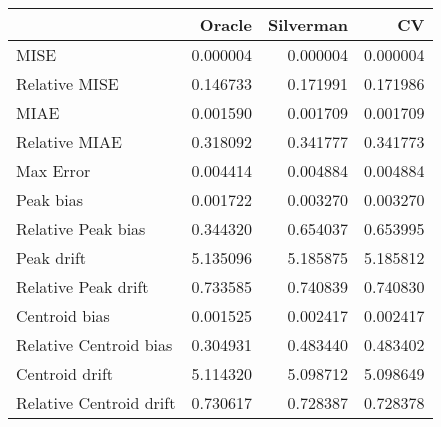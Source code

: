 \begin{tabular}{lrrr}
  \hline
 & Oracle & Silverman & CV \\ 
  \hline
MISE & 0.000004 & 0.000004 & 0.000004 \\ 
  Relative MISE & 0.146733 & 0.171991 & 0.171986 \\ 
  MIAE & 0.001590 & 0.001709 & 0.001709 \\ 
  Relative MIAE & 0.318092 & 0.341777 & 0.341773 \\ 
  Max Error & 0.004414 & 0.004884 & 0.004884 \\ 
  Peak bias & 0.001722 & 0.003270 & 0.003270 \\ 
  Relative Peak bias & 0.344320 & 0.654037 & 0.653995 \\ 
  Peak drift & 5.135096 & 5.185875 & 5.185812 \\ 
  Relative Peak drift & 0.733585 & 0.740839 & 0.740830 \\ 
  Centroid bias & 0.001525 & 0.002417 & 0.002417 \\ 
  Relative Centroid bias & 0.304931 & 0.483440 & 0.483402 \\ 
  Centroid drift & 5.114320 & 5.098712 & 5.098649 \\ 
  Relative Centroid drift & 0.730617 & 0.728387 & 0.728378 \\ 
   \hline
\end{tabular}
